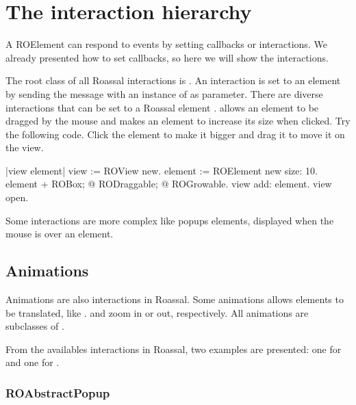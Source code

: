 \documentclass[a4paper,10pt,twoside]{book}
\begin{document}
\section{The interaction hierarchy} 

A ROElement can respond to events by setting callbacks or interactions. We already presented how to set callbacks, so here we will show the interactions. 

The root class of all Roassal interactions is . An interaction is set to an element by sending the  message with an instance of  as parameter. There are diverse interactions that can be set to a Roassal element .
  allows an element to be dragged by the mouse and  makes an element to increase its size when clicked. Try the following code. Click the element to make it bigger and drag it to move it on the view.

\begin{code}{}
|view element|
view := ROView new.
element := ROElement new size: 10.
element 
	+ ROBox;
	@ RODraggable; 
	@ ROGrowable.
view add: element.
view open.
\end{code}


Some interactions are more complex like popups elements, displayed when the mouse is over an element. 


\subsection{Animations} Animations are also interactions in Roassal. Some animations allows elements to be translated, like .  and  zoom in or out, respectively. All animations are subclasses of .

From the availables interactions in Roassal, two examples are presented: one for  and one for .

\subsubsection*{ROAbstractPopup}
\end{document}
